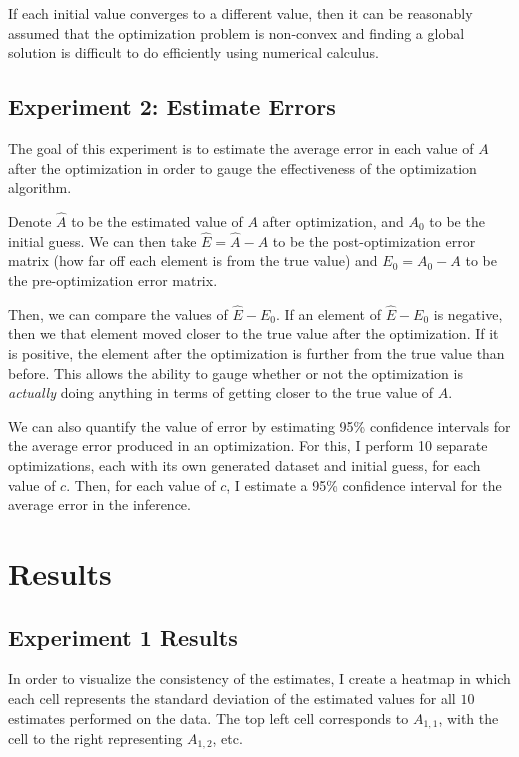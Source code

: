 \documentclass[12pt]{article}
\theoremstyle{definition}
\begin{document}
If each initial value converges to a different value, then it can be reasonably assumed that the optimization problem is non-convex and finding a global solution is difficult to do efficiently using numerical calculus.

\subsection{Experiment 2: Estimate Errors}

The goal of this experiment is to estimate the average error in each value of $A$ after the optimization in order to gauge the effectiveness of the optimization algorithm. 

Denote $\hat{A}$ to be the estimated value of $A$ after optimization, and $A_0$ to be the initial guess. We can then take $\hat{E} = \hat{A} - A$ to be the post-optimization error matrix (how far off each element is from the true value) and $E_0 = A_0 - A$ to be the pre-optimization error matrix. 

Then, we can compare the values of $\hat{E} - E_0$. If an element of $\hat{E} - E_0$ is negative, then we that element moved closer to the true value after the optimization. If it is positive, the element after the optimization is further from the true value than before. This allows the ability to gauge whether or not the optimization is \textit{actually} doing anything in terms of getting closer to the true value of $A$.

We can also quantify the value of error by estimating 95\% confidence intervals for the average error produced in an optimization. For this, I perform 10 separate optimizations, each with its own generated dataset and initial guess, for each value of $c$. Then, for each value of $c$, I estimate a 95\% confidence interval for the average error in the inference.



\section{Results}
\label{sec:results}

\subsection{Experiment 1 Results}
\label{subsec:Exper1Results}

In order to visualize the consistency of the estimates, I create a heatmap in which each cell represents the standard deviation of the estimated values for all $10$ estimates performed on the data. The top left cell corresponds to $A_{1, 1}$, with the cell to the right representing $A_{1, 2}$, etc. 
\end{document}
